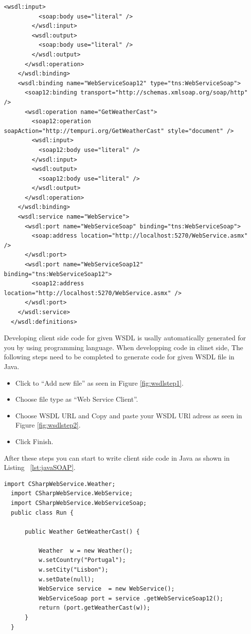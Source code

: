 \begin{lstlisting}[caption=WSDL Document for Weathercast Provider, label=lst:wsdldocument]
        <wsdl:input>
          <soap:body use="literal" />
        </wsdl:input>
        <wsdl:output>
          <soap:body use="literal" />
        </wsdl:output>
      </wsdl:operation>
    </wsdl:binding>
    <wsdl:binding name="WebServiceSoap12" type="tns:WebServiceSoap">
      <soap12:binding transport="http://schemas.xmlsoap.org/soap/http" />
      <wsdl:operation name="GetWeatherCast">
        <soap12:operation soapAction="http://tempuri.org/GetWeatherCast" style="document" />
        <wsdl:input>
          <soap12:body use="literal" />
        </wsdl:input>
        <wsdl:output>
          <soap12:body use="literal" />
        </wsdl:output>
      </wsdl:operation>
    </wsdl:binding>
    <wsdl:service name="WebService">
      <wsdl:port name="WebServiceSoap" binding="tns:WebServiceSoap">
        <soap:address location="http://localhost:5270/WebService.asmx" />
      </wsdl:port>
      <wsdl:port name="WebServiceSoap12" binding="tns:WebServiceSoap12">
        <soap12:address location="http://localhost:5270/WebService.asmx" />
      </wsdl:port>
    </wsdl:service>
  </wsdl:definitions>
\end{lstlisting}

Developing client side code for given WSDL is usally automatically generated for you by using programming language. When developping code in clinet side, The following steps need to be completed to generate code for given WSDL file in Java.
\begin{itemize}
  \item Click to “Add new file” as seen in Figure \ref{fig:wsdlstep1}.
  \item Choose file type as “Web Service Client”.
  \item Choose WSDL URL and Copy and paste your WSDL URl adress as seen in Figure \ref{fig:wsdlstep2}.
  \item Click Finish.
\end{itemize}

After these steps you can start to write client side code in Java as shown in Listing ~\ref{lst:javaSOAP}.

\begin{lstlisting}[caption=SOAP Web Service Client with Java, label=lst:javaSOAP]
  import CSharpWebService.Weather;
  import CSharpWebService.WebService;
  import CSharpWebService.WebServiceSoap;
  public class Run {

      public Weather GetWeatherCast() {

          Weather  w = new Weather();
          w.setCountry("Portugal");
          w.setCity("Lisbon");
          w.setDate(null);
          WebService service  = new WebService();
          WebServiceSoap port = service .getWebServiceSoap12();
          return (port.getWeatherCast(w));
      }
  }

\end{lstlisting}

